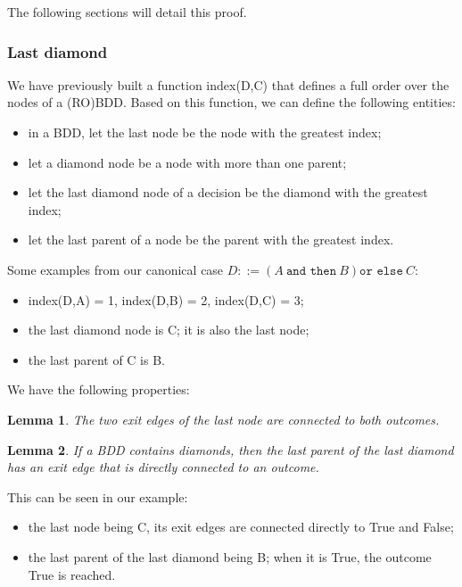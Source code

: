 \documentclass[a4paper,12pt,twoside]{article}
\newcommand{\andthen}{\texttt{and then}}
\newcommand{\orelse}{\texttt{or else}}
\newtheorem{lemma}{Lemma}[subsection]
\begin{document}
The following sections will detail this proof.

\subsubsection{Last diamond}

We have previously built a function index(D,C) that defines a full
order over the nodes of a (RO)BDD. Based on this function, we can
define the following entities:
\begin{itemize}
\item in a BDD, let the last node be the node with the greatest index;
\item let a diamond node be a node with more than one parent;
\item let the last diamond node of a decision be the diamond with the
      greatest index;
\item let the last parent of a node be the parent with the greatest index.
\end{itemize}

Some examples from our canonical case
$D ::= (A \ \andthen{} \ B) \orelse{} \ C$:
\begin{itemize}
\item index(D,A) = 1, index(D,B) = 2, index(D,C) = 3;
\item the last diamond node is C; it is also the last node;
\item the last parent of C is B.
\end{itemize}

We have the following properties:

\begin{lemma}
  \label{lemma:last-node}
  The two exit edges of the last node are connected to both outcomes.
\end{lemma}

\begin{lemma}
  \label{lemma:last-parent-of-the-last-diamond}
   If a BDD contains diamonds, then the last parent of the last diamond
   has an exit edge that is directly connected to an outcome.
\end{lemma}

This can be seen in our example:
\begin{itemize}
\item the last node being C, its exit edges are connected directly to True and
      False;
\item the last parent of the last diamond being B; when it is True, the outcome
      True is reached.
\end{itemize}
\end{document}

